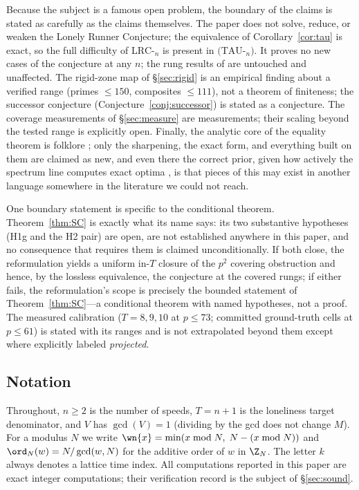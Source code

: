 Because the subject is a famous open problem, the boundary of the claims
is stated as carefully as the claims themselves. The paper does not solve,
reduce, or weaken the Lonely Runner Conjecture; the equivalence of
Corollary~\ref{cor:tau} is exact, so the full difficulty of
$\mathrm{LRC}$-$_n$ is present in $(\mathrm{TAU}$-$_n)$. It proves no new
cases of the conjecture at any $n$; the rung results of
\cite{Rosenfeld8,Trakulthongchai,Sungkawichai,Allikvere} are untouched and
unaffected. The rigid-zone map of \S\ref{sec:rigid} is an empirical
finding about a verified range (primes $\le 150$, composites $\le 111$),
not a theorem of finiteness; the successor conjecture
(Conjecture~\ref{conj:successor}) is stated as a conjecture. The coverage
measurements of \S\ref{sec:measure} are measurements; their scaling
beyond the tested range is explicitly open. Finally, the analytic core of
the equality theorem is folklore \cite{Tao-blog}; only the sharpening, the
exact form, and everything built on them are claimed as new, and even
there the correct prior, given how actively the spectrum line computes
exact optima \cite{Cordella}, is that pieces of this may exist in another
language somewhere in the literature we could not reach.

One boundary statement is specific to the conditional theorem.
Theorem~\ref{thm:SC} is exactly what its name says: its two substantive
hypotheses (H1g and the H2 pair) are open, are not established anywhere
in this paper, and no consequence that requires them is claimed
unconditionally. If both close, the reformulation yields a uniform
in-$T$ closure of the $p^2$ covering obstruction and hence, by the
lossless equivalence, the conjecture at the covered rungs; if either
fails, the reformulation's scope is precisely the bounded statement of
Theorem~\ref{thm:SC}---a conditional theorem with named hypotheses, not
a proof. The measured calibration ($T=8,9,10$ at $p\le73$; committed
ground-truth cells at $p\le61$) is stated with its ranges and is not
extrapolated beyond them except where explicitly labeled
\emph{projected}.

\subsection{Notation}

Throughout, $n\ge 2$ is the number of speeds, $T=n+1$ is the loneliness
target denominator, and $V$ has $\gcd(V)=1$ (dividing by the gcd does not
change $M$). For a modulus $N$ we write $\wn{x}=\min(x\bmod N,\;
N-(x\bmod N))$ and $\ord_N(w)=N/\gcd(w,N)$ for the additive order of $w$
in $\Z_N$. The letter $k$ always denotes a lattice time index. All
computations reported in this paper are exact integer computations; their
verification record is the subject of \S\ref{sec:sound}.
